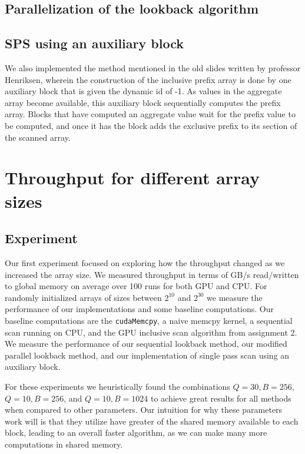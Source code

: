 \documentclass[twocolumn]{article}
\begin{document}
\subsection{Parallelization of the lookback algorithm}

\subsection{SPS using an auxiliary block}

We also implemented the method mentioned in the old slides written by professor Henriksen, wherein the construction of the inclusive prefix array is done by one auxiliary block that is given the dynamic id of -1. As values in the aggregate array become available, this auxiliary block sequentially computes the prefix array. Blocks that have computed an aggregate value wait for the prefix value to be computed, and once it has the block adds the exclusive prefix to its section of the scanned array.

\section{Throughput for different array sizes}
\label{sec:tp_diff_arr_sizes}
\subsection{Experiment}
Our first experiment focused on exploring how the throughput changed as we increased the array size. We measured throughput in terms of GB/s read/written to global memory on average over 100 runs for both GPU and CPU. For randomly initialized arrays of sizes between $2^{10}$ and $2^{30}$ we measure the performance of our implementations and some baseline computations. Our baseline computations are the \verb|cudaMemcpy|, a naive memcpy kernel, a sequential scan running on CPU, and the GPU inclusive scan algorithm from assignment 2. We measure the performance of our sequential lookback method, our modified parallel lookback method, and our implementation of single pass scan using an auxiliary block.

For these experiments we heuristically found the combinations $Q=30,B=256$, $Q=10, B=256$, and $Q=10,B=1024$ to achieve great results for all methods when compared to other parameters. Our intuition for why these parameters work will is that they utilize have greater of the shared memory available to each block, leading to an overall faster algorithm, as we can make many more computations in shared memory.
\end{document}
